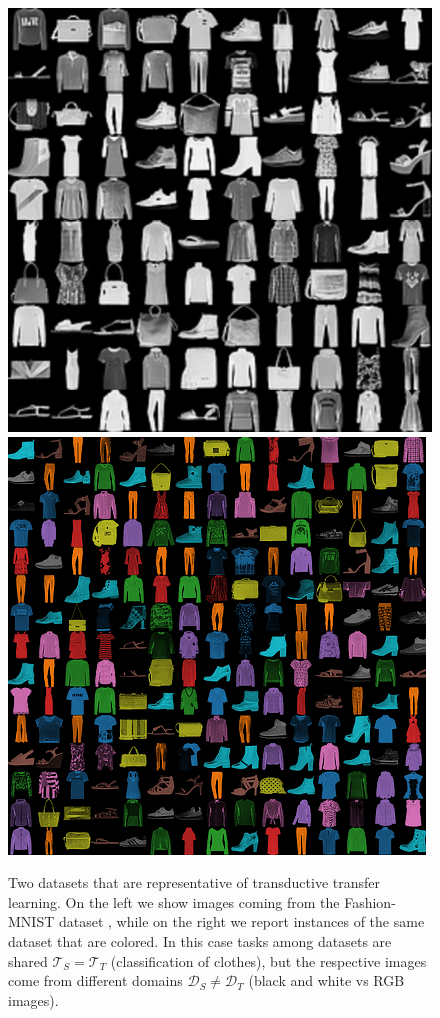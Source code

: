 \begin{figure}
    \includegraphics[width=\linewidth]{./Images/Chapter03/fashion_mnist}
  \endminipage\hfill
    \includegraphics[width=\linewidth]{./Images/Chapter03/colorful_fashion_mnist}
  \endminipage\hfill
  \caption{Two datasets that are representative of transductive transfer learning. On the left we show images coming from the Fashion-MNIST dataset \cite{xiao2017fashion}, while on the right we report instances of the same dataset that are colored. In this case tasks among datasets are shared $\mathcal{T}_S = \mathcal{T}_T$ (classification of clothes), but the respective images come from different domains $\mathcal{D}_S \neq \mathcal{D}_T$ (black and white vs RGB images).}
  \label{fig:transductive_tl}
\end{figure}

